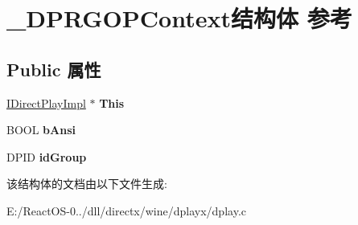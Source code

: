 \hypertarget{struct___d_p_r_g_o_p_context}{}\section{\+\_\+\+D\+P\+R\+G\+O\+P\+Context结构体 参考}
\label{struct___d_p_r_g_o_p_context}
\subsection*{Public 属性}
\begin{DoxyCompactItemize}
\item 
\mbox{\label{struct___d_p_r_g_o_p_context_a3444b7b1663242df90178081cad7445f}} 
\hyperlink{struct_i_direct_play_impl}{I\+Direct\+Play\+Impl} $\ast$ {\bfseries This}
\item 
\mbox{\label{struct___d_p_r_g_o_p_context_a78dd0c4c96de307e99dc3731593dcee3}} 
B\+O\+OL {\bfseries b\+Ansi}
\item 
\mbox{\label{struct___d_p_r_g_o_p_context_a5fb974776e4c52a6a6b46bcfd449eaae}} 
D\+P\+ID {\bfseries id\+Group}
\end{DoxyCompactItemize}


该结构体的文档由以下文件生成\+:\begin{DoxyCompactItemize}
\item 
E\+:/\+React\+O\+S-\/0../dll/directx/wine/dplayx/dplay.\+c\end{DoxyCompactItemize}
